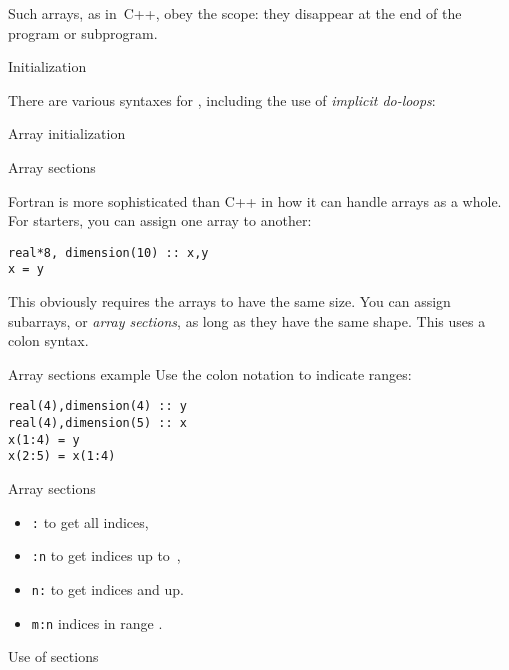 Such arrays, as in~C++, obey the scope: they disappear at the end of
the program or subprogram.

 {Initialization}

There are various syntaxes for ,
including the use of
\emph{implicit do-loops}:
%
\begin{block}{Array initialization}
  \label{sl:farray-init}
\end{block}

 {Array sections}

Fortran is more sophisticated than C++ in how it can handle arrays as
a whole. For starters, you can assign one array to another:

\begin{lstlisting}
real*8, dimension(10) :: x,y
x = y
\end{lstlisting}

This obviously requires the arrays to have the same size.
You can assign subarrays, or \emph{array sections},
as long as they have the same shape. This uses a colon syntax.

\begin{slide}{Array sections example}
  \label{sl:farray-section}
  Use the colon notation to indicate ranges:
\begin{lstlisting}
real(4),dimension(4) :: y
real(4),dimension(5) :: x
x(1:4) = y
x(2:5) = x(1:4)
\end{lstlisting}
\end{slide}

\begin{block}{Array sections}
  \label{sl:farray-sections}
  \begin{itemize}
  \item {\tt :} %
    to get all indices,
  \item {\tt :n} %
    to get indices up to~,
  \item {\tt n:} %
    to get indices  and up.
  \item {\tt m:n}
    indices in range .
  \end{itemize}
\end{block}

\begin{block}{Use of sections}
  \label{sl:farray-sectionassign}
\end{block}

